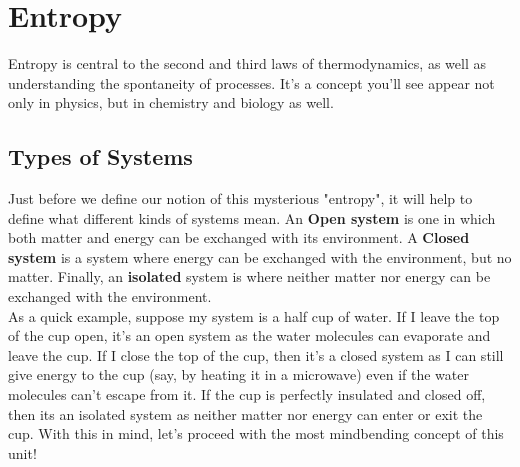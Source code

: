 \section{Entropy}
Entropy is central to the second and third laws of thermodynamics, as well as understanding the spontaneity of processes. It's a concept you'll see appear not only in physics, but in chemistry and biology as well.

\subsection{Types of Systems}
Just before we define our notion of this mysterious "entropy", it will help to define what different kinds of systems mean. An \textbf{Open system} is one in which both matter and energy can be exchanged with its environment. A \textbf{Closed system} is a system where energy can be exchanged with the environment, but no matter. Finally, an \textbf{isolated} system is where neither matter nor energy can be exchanged with the environment. \\
As a quick example, suppose my system is a half cup of water. If I leave the top of the cup open, it's an open system as the water molecules can evaporate and leave the cup. If I close the top of the cup, then it's a closed system as I can still give energy to the cup (say, by heating it in a microwave) even if the water molecules can't escape from it. If the cup is perfectly insulated and closed off, then its an isolated system as neither matter nor energy can enter or exit the cup. With this in mind, let's proceed with the most mindbending concept of this unit!


